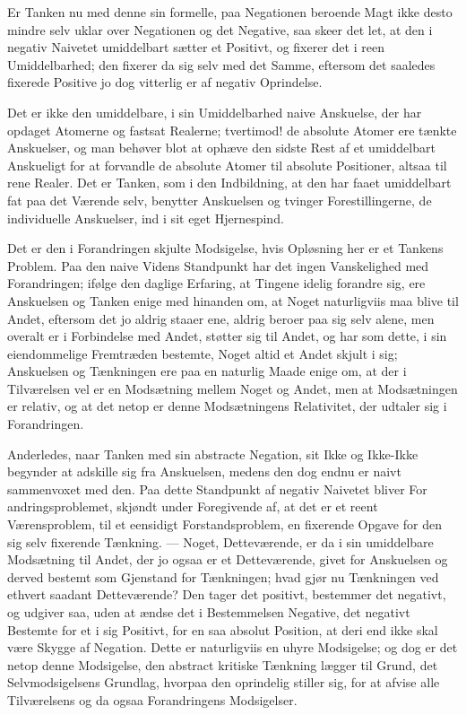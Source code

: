 \documentclass[12pt]{book}
\newcommand{\opage}[1]{\marginnote{\footnotesize\textit{[#1]}}}
\begin{document}
\opage{15} Er Tanken nu med denne sin formelle, paa Negationen beroende Magt ikke desto mindre
selv uklar over Negationen og det Negative, saa skeer det let, at den i negativ
Naivetet umiddelbart sætter et Positivt, og fixerer det i reen Umiddelbarhed; den
fixerer da sig selv med det Samme, eftersom det saaledes fixerede Positive jo dog
vitterlig er af negativ Oprindelse.

Det er ikke den umiddelbare, i sin Umiddelbarhed naive Anskuelse, der har opdaget
Atomerne og fastsat Realerne; tvertimod! de absolute Atomer ere tænkte Anskuelser,
og man behøver blot at ophæve den sidste Rest af et umiddelbart Anskueligt for at
forvandle de absolute Atomer til absolute Positioner, altsaa til rene Realer. Det er
Tanken, som i den Indbildning, at den har faaet umiddelbart fat paa det Værende selv,
benytter Anskuelsen og tvinger Forestillingerne, de individuelle Anskuelser, ind i
sit eget Hjernespind.

Det er den i Forandringen skjulte Modsigelse, hvis Opløsning her er et Tankens
Problem. Paa den naive Videns Standpunkt har det ingen Vanskelighed med Forandringen;
ifølge den daglige Erfaring, at Tingene idelig forandre sig, ere Anskuelsen og Tanken
enige med hinanden om, at Noget naturligviis maa blive til Andet, eftersom det jo
aldrig staaer ene, aldrig beroer paa sig selv alene, men overalt er i Forbindelse med
Andet, støtter sig til Andet, og har som dette, i sin eiendommelige Fremtræden
bestemte, Noget altid et Andet skjult i sig; Anskuelsen og Tænkningen ere paa en
naturlig Maade enige om, at der i Tilværelsen vel er en Modsætning mellem Noget og
Andet, men at Modsætningen er relativ, og at det netop er denne Modsætningens
Relativitet, der udtaler sig i Forandringen.

Anderledes, naar Tanken med sin abstracte Negation, sit Ikke og Ikke-Ikke begynder at
adskille sig fra Anskuelsen, medens den dog endnu er naivt sammenvoxet med den. Paa
dette Standpunkt af negativ Naivetet bliver For%
\opage{16} andringsproblemet, skjøndt under Foregivende af, at det er et reent Værensproblem,
til et eensidigt Forstandsproblem, en fixerende Opgave for den sig selv fixerende
Tænkning. --- Noget, Detteværende, er da i sin umiddelbare Modsætning til Andet, der
jo ogsaa er et Detteværende, givet for Anskuelsen og derved bestemt som Gjenstand for
Tænkningen; hvad gjør nu Tænkningen ved ethvert saadant Detteværende? Den tager det
positivt, bestemmer det negativt, og udgiver saa, uden at ændse det i Bestemmelsen
Negative, det negativt Bestemte for et i sig Positivt, for en saa absolut Position,
at deri end ikke skal være Skygge af Negation. Dette er naturligviis en uhyre
Modsigelse; og dog er det netop denne Modsigelse, den abstract kritiske Tænkning
lægger til Grund, det Selvmodsigelsens Grundlag, hvorpaa den oprindelig stiller sig,
for at afvise alle Tilværelsens og da ogsaa Forandringens Modsigelser.
\end{document}
